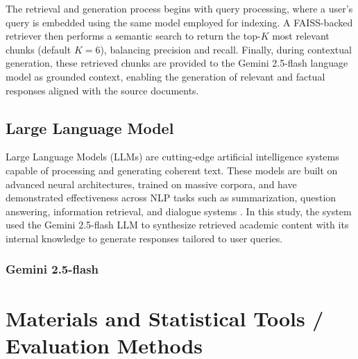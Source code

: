 \begin{refsection}
The retrieval and generation process begins with query processing, where a user's query is embedded using the same model employed for indexing. A FAISS-backed retriever then performs a semantic search to return the top-$K$ most relevant chunks (default $K=6$), balancing precision and recall. Finally, during contextual generation, these retrieved chunks are provided to the Gemini 2.5-flash language model as grounded context, enabling the generation of relevant and factual responses aligned with the source documents.

\subsection{Large Language Model}

Large Language Models (LLMs) are cutting-edge artificial intelligence systems capable of processing and generating coherent text. These models are built on advanced neural architectures, trained on massive corpora, and have demonstrated effectiveness across NLP tasks such as summarization, question answering, information retrieval, and dialogue systems \citeauthor{naveed2024} \citeyear{naveed2024}. In this study, the system used the Gemini 2.5-flash LLM to synthesize retrieved academic content with its internal knowledge to generate responses tailored to user queries.

\subsubsection{Gemini 2.5-flash}


\section{Materials and Statistical Tools / Evaluation Methods}


\end{refsection}
